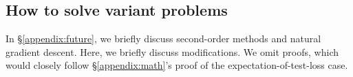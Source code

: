 \documentclass[anon,12pt]{colt2021} %
\newcommand{\rvalue}{\text{\textnormal{rvalue}}}
\newcommand{\plotmooh}[3]{\texttt{[image: ../\#1]}}
\newcommand{\dmoo}[2]{\texttt{[image: ../diagrams/\#2]}}
\newcommand{\sizeddia}[2]{%
    \begin{gathered}%
        \texttt{[image: ../diagrams/\#1.png]}%
    \end{gathered}%
}
\newcommand{\sdia}[1]{\protect \sizeddia{#1}{0.10}}
\begin{document}
{    %





    \subsection{How to solve variant problems}                      \label{appendix:solve-variants}
        In \S\ref{appendix:future}, we briefly discuss second-order methods
        and natural gradient descent.  Here, we briefly discuss modifications.
        We omit proofs, which would closely follow \S\ref{appendix:math}'s
        proof of the expectation-of-test-loss case.

}
\end{document}
